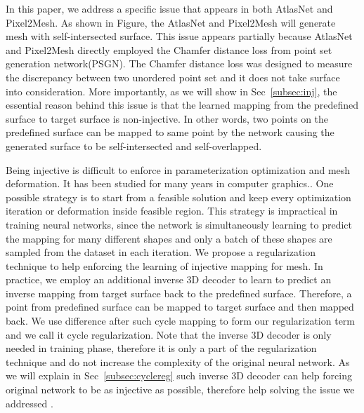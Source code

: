 In this paper, we address a specific issue that appears in both AtlasNet\cite{atlasnet} and Pixel2Mesh\cite{pixel2mesh}. As shown in Figure, the AtlasNet and Pixel2Mesh will generate mesh with self-intersected surface. This issue appears partially because AtlasNet and Pixel2Mesh directly employed the Chamfer distance loss from point set generation network(PSGN)\cite{PSGN}. The Chamfer distance loss was designed to measure the discrepancy between two unordered point set and it does not take surface into consideration. More importantly, as we will show in Sec~\ref{subsec:inj}, the essential reason behind this issue is that the learned mapping from the predefined surface to target surface is non-injective. In other words, two points on the predefined surface can be mapped to same point by the network causing the generated surface to be self-intersected and self-overlapped. 

Being injective is difficult to enforce in parameterization optimization and mesh deformation. It has been studied for many years in computer graphics.. One possible strategy is to start from a feasible solution and keep every optimization iteration or deformation inside feasible region. This strategy is impractical in training neural networks, since the network is simultaneously learning to predict the mapping for many different shapes and only a batch of these shapes are sampled from the dataset in each iteration. We propose a regularization technique to help enforcing the learning of injective mapping for mesh. In practice, we employ an additional inverse 3D decoder to learn to predict an inverse mapping from target surface back to the predefined surface. Therefore, a point from predefined surface can be mapped to target surface and then mapped back. We use difference after such cycle mapping to form our regularization term and we call it cycle regularization. Note that the inverse 3D decoder is only needed in training phase, therefore it is only a part of the regularization technique and do not increase the complexity of the original neural network. As we will explain in Sec~\ref{subsec:cyclereg} such inverse 3D decoder can help forcing original network to be as injective as possible, therefore help solving the issue we addressed .

 